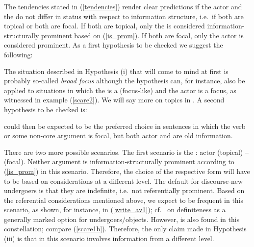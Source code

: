 \documentclass[output=paper,
,modfonts
,nonflat]{langsci/langscibook}
\begin{document}
The tendencies stated in (\ref{tendencies}) render clear predictions if the actor and the  do not differ in status with respect to information structure, i.e.\ if both are topical or both are focal. If both are topical, only the  is considered information-structurally prominent based on (\ref{is_prom}). If both are focal, only the actor is considered %
prominent. As a first hypothesis to be checked we suggest the following:


\noindent The situation described in Hypothesis (i) that will come to mind at first is probably so-called \textit{broad focus} although the hypothesis can, for instance, also be applied to situations in which the  is a (focus-like)  and the actor is a focus, as witnessed in example (\ref{scare2}). We will say more on  topics in . A second hypothesis to be checked is:


\noindent {}  could then be expected to be the preferred choice in sentences in which the verb or some non-core argument is focal, but both actor and  are old information.

There are two more possible scenarios. The first scenario is the : actor (topical) --  (focal). Neither argument is in\-for\-ma\-tion-struc\-tu\-ral\-ly prominent according to (\ref{is_prom}) in this scenario. Therefore, the choice of the respective  form will have to be based on  considerations at a different level. The default for discourse-new undergoers is that they are indefinite, i.e.\ not referentially prominent. Based on the referential  considerations mentioned above, we expect  to be frequent in this scenario, as shown, for instance, in (\ref{write_av1}); cf.\ \cite{pribe12} on definiteness as a generally marked option for undergoers/objects. However,  is also found in this constellation; compare (\ref{scare1b}). Therefore, the only claim made in Hypothesis (iii) is that  in this scenario involves information from a different level.
\end{document}
